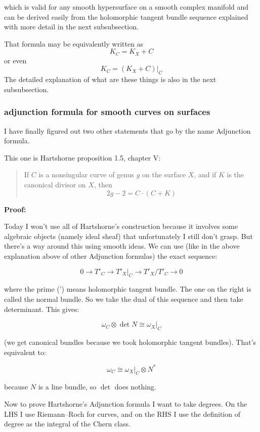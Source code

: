 which is valid for any smooth hypersurface on a smooth complex manifold and can be derived easily from the holomorphic tangent bundle sequence explained with more detail in the next subsubsection.

That formula may be equivalently written as
\[K_C=K_X + C\]
or even
\[K_C = (K_X+C)|_{C}\]
The detailed explanation of what are these things is also in the next subsubsection.

\subsubsection{adjunction formula for smooth curves on surfaces}

I have finally figured out two other statements that go by the name Adjunction formula.

This one is Hartshorne proposition 1.5, chapter V:

\begin{quote}
If \( C \) is a nonsingular curve of genus \( g \) on the surface \( X \), and if \( K \) is the canonical divisor on \( X \), then
\[
2g - 2 = C \cdot (C + K)
\]
\end{quote}

\textbf{Proof:}

Today I won’t use all of Hartshorne’s construction because it involves some algebraic objects (namely ideal sheaf) that unfortunately I still don’t grasp. But there’s a way around this using smooth ideas. We can use (like in the above explanation above of other Adjunction formulas) the exact sequence:

\[
0 \to T'_C \to T'_X|_C \to T'_X / T'_C \to 0
\]

where the prime (') means holomorphic tangent bundle. The one on the right is called the normal bundle. So we take the dual of this sequence and then take determinant. This gives:

\[
\omega_C \otimes \det N \cong \omega_X|_C
\]

(we get canonical bundles because we took holomorphic tangent bundles). That’s equivalent to:

\[
\omega_C \cong \omega_X|_C \otimes N^*
\]

because \( N \) is a line bundle, so \( \det \) does nothing.

Now to prove Hartshorne’s Adjunction formula I want to take degrees. On the LHS I use Riemann–Roch for curves, and on the RHS I use the definition of degree as the integral of the Chern class.

